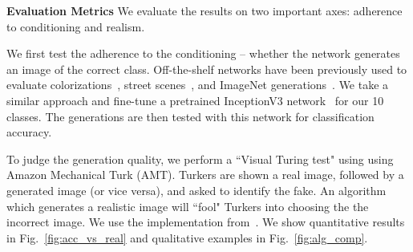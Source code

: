 

\noindent \textbf{Evaluation Metrics} We evaluate the results on two important axes: adherence to conditioning and realism.

We first test the adherence to the conditioning -- whether the network generates an image of the correct class. Off-the-shelf networks have been previously used to evaluate colorizations~\cite{zhang2016colorful}, street scenes~\cite{isola2016image2image, wang2017high}, and ImageNet generations~\cite{salimans2016improved}. We take a similar approach and fine-tune a pretrained InceptionV3 network~\cite{szegedy2016rethinking} for our 10 classes. The generations are then tested with this network for classification accuracy.

To judge the generation quality, we perform a ``Visual Turing test" using using Amazon Mechanical Turk (AMT). Turkers are shown a real image, followed by a generated image (or vice versa), and asked to identify the fake. An algorithm which generates a realistic image will ``fool" Turkers into choosing the the incorrect image. We use the implementation from~\cite{zhang2016colorful}. We show quantitative results in Fig.~\ref{fig:acc_vs_real} and qualitative examples in Fig.~\ref{fig:alg_comp}.

